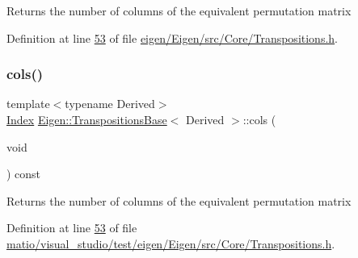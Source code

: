 \begin{DoxyReturn}{Returns}
the number of columns of the equivalent permutation matrix 
\end{DoxyReturn}


Definition at line \hyperlink{eigen_2_eigen_2src_2_core_2_transpositions_8h_source_l00053}{53} of file \hyperlink{eigen_2_eigen_2src_2_core_2_transpositions_8h_source}{eigen/\+Eigen/src/\+Core/\+Transpositions.\+h}.

\mbox{\label{class_eigen_1_1_transpositions_base_acb6f58081640839bd4102b75bdeec562}} 
\subsubsection{\texorpdfstring{cols()}{cols()}\hspace{0.1cm}{\footnotesize\ttfamily [2/2]}}
{\footnotesize\ttfamily template$<$typename Derived$>$ \\
\hyperlink{class_eigen_1_1_transpositions_base_a3f5f06118b419e8e6ccbe49ed5b4c91f}{Index} \hyperlink{class_eigen_1_1_transpositions_base}{Eigen\+::\+Transpositions\+Base}$<$ Derived $>$\+::cols (\begin{DoxyParamCaption}\item[{void}]{ }\end{DoxyParamCaption}) const\hspace{0.3cm}{\ttfamily [inline]}}

\begin{DoxyReturn}{Returns}
the number of columns of the equivalent permutation matrix 
\end{DoxyReturn}


Definition at line \hyperlink{matio_2visual__studio_2test_2eigen_2_eigen_2src_2_core_2_transpositions_8h_source_l00053}{53} of file \hyperlink{matio_2visual__studio_2test_2eigen_2_eigen_2src_2_core_2_transpositions_8h_source}{matio/visual\+\_\+studio/test/eigen/\+Eigen/src/\+Core/\+Transpositions.\+h}.

\mbox{\label{class_eigen_1_1_transpositions_base_a90acc796341b4627882705d1099e593d}} 
